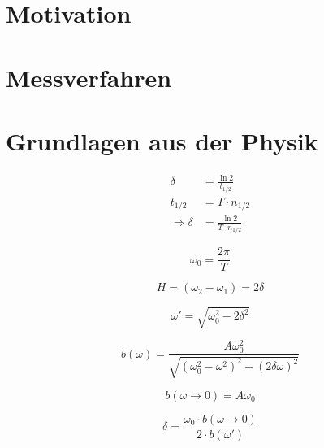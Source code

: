 \section{Motivation}



\section{Messverfahren}



\section{Grundlagen aus der Physik}

\begin{align}
    \delta &= \frac{\ln 2}{t_{1/2}} \\
    t_{1/2} &= T  \cdot n_{1/2} \\
    \Rightarrow \delta &= \frac{\ln 2}{T  \cdot n_{1/2}}
    \label{eq:delta}
\end{align}

\begin{equation}
    \omega_0 = \frac{2\pi}{T}
    \label{eq:eigen}
\end{equation}

\begin{equation}
    H = (\omega_2-\omega_1) = 2\delta
    \label{eq:halb}
\end{equation}

\begin{equation}
    \omega' = \sqrt{\omega_0^2 - 2\delta^2}
\end{equation}

\begin{equation}
    b(\omega) = \frac{A\omega_0^2}{\sqrt{(\omega_0^2-\omega^2)^2 - (2\delta\omega)^2}}
\end{equation}

\begin{equation}
    b(\omega \rightarrow 0) = A \omega_0
\end{equation}

\begin{equation}
    \delta = \frac{\omega_0 \cdot b(\omega \rightarrow 0)}{2 \cdot b(\omega')}
    \label{eq:deltafertig}
\end{equation}